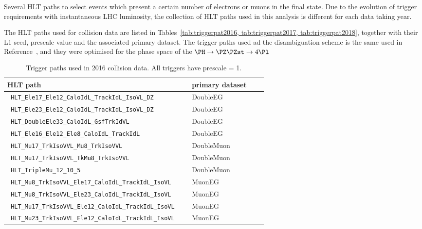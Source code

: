 Several HLT paths to select events which present a certain number of electrons or muons in the final state.
Due to the evolution of trigger requirements with instantaneous LHC luminosity,
the collection of HLT paths used in this analysis is different for each data taking year.

The HLT paths used for collision data are listed in Tables~\ref{tab:triggerpat2016, tab:triggerpat2017, tab:triggerpat2018}, 
together with their L1 seed, prescale value and the associated primary dataset.
The trigger paths used ad the disambiguation scheme is the same used in Reference~\cite{HiggsLegacyPaper},
and they were optimised for the phase space of the $\PH \rightarrow \PZ \PZst \rightarrow 4\Pl$

\begin{table*}
  \caption{Trigger paths used in 2016 collision data. All triggers have prescale = 1.}
  \label{tab:trigpat2016}
  \centering
  \begin{tabular}{|l|l|c|l|} 
    \hline %
    HLT path                                                   & primary dataset \\
    \hline %
    \verb| HLT_Ele17_Ele12_CaloIdL_TrackIdL_IsoVL_DZ         | & DoubleEG \\
    \verb| HLT_Ele23_Ele12_CaloIdL_TrackIdL_IsoVL_DZ         | & DoubleEG \\
    \verb| HLT_DoubleEle33_CaloIdL_GsfTrkIdVL                | & DoubleEG \\
    \verb| HLT_Ele16_Ele12_Ele8_CaloIdL_TrackIdL             | & DoubleEG \\
    \verb| HLT_Mu17_TrkIsoVVL_Mu8_TrkIsoVVL                  | & DoubleMuon \\
    \verb| HLT_Mu17_TrkIsoVVL_TkMu8_TrkIsoVVL                | & DoubleMuon \\
    \verb| HLT_TripleMu_12_10_5                              | & DoubleMuon \\
    \verb| HLT_Mu8_TrkIsoVVL_Ele17_CaloIdL_TrackIdL_IsoVL    | & MuonEG \\
    \verb| HLT_Mu8_TrkIsoVVL_Ele23_CaloIdL_TrackIdL_IsoVL    | & MuonEG \\
    \verb| HLT_Mu17_TrkIsoVVL_Ele12_CaloIdL_TrackIdL_IsoVL   | & MuonEG \\
    \verb| HLT_Mu23_TrkIsoVVL_Ele12_CaloIdL_TrackIdL_IsoVL   | & MuonEG \\

\end{tabular}
\end{table*}

